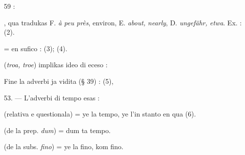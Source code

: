 \begin{VUpage}[63]{59}
 : \cc
{}

, qua tradukas F. \textit{à peu près}, environ, E. \textit{about,}\nl
\textit{nearly}, D. \textit{ungefähr, etwa}. Ex. : \nl
{} (2).

 = en sufico :  (3); \nl
{} (4).

 (\textit{troa, troe}) implikas ideo di eceso : \nl
{}

Fine la adverbi ja vidita (§ 39) : \nl
{} (5), 

\VUblanc{5.19pt}%
53. --- L'adverbi di tempo esas :

 (relativa e questionala) = ye la tempo, ye l'in\cc
stanto en qua (6).

 (de la prep. \textit{dum}) = dum ta tempo.

 (de la subs. \textit{fino}) = ye la fino, kom fino.
\end{VUpage}

